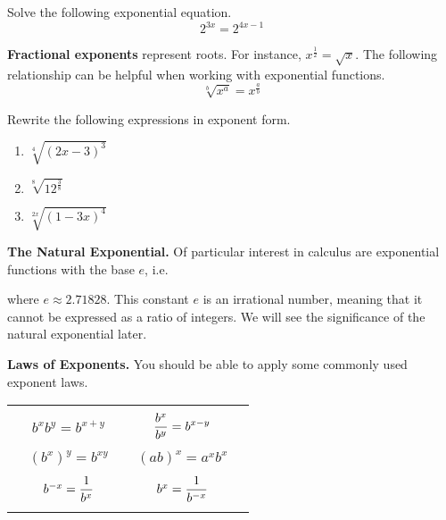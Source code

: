 \documentclass[12pt]{article}
\begin{document}
\vspace{3mm}

\Example Solve the following exponential equation.
$$2^{3x}=2^{4x-1}$$

\newpage

\textbf{Fractional exponents} represent roots. For instance, $x^{\frac{1}{2}}=\sqrt{x}$. The following relationship can be helpful when working with exponential functions.
$$\sqrt[b]{x^a}=x^{\frac{a}{b}}$$

\Example Rewrite the following expressions in exponent form.

\begin{enumerate}
	\item[\tc{1}] $\sqrt[4]{(2x-3)^3}$
	\vspace{2mm}
	\item[\tc{2}] $\sqrt[8]{12^\frac{3}{8}}$
	\vspace{2mm}
	\item[\tc{3}] $\sqrt[2x]{(1-3x)^4}$
	\vspace{2mm}
\end{enumerate}

\vspace{3mm}

\textbf{The Natural Exponential.} Of particular interest in calculus are exponential functions with the base $e$, i.e.

\vspace{15mm}

where $e\approx 2.71828$. This constant $e$ is an irrational number, meaning that it cannot be expressed as a ratio of integers. We will see the significance of the natural exponential later.

\vspace{5mm}

\textbf{Laws of Exponents.} You should be able to apply some commonly used exponent laws.

\begin{center}
\begin{tabular}{|ccccc|}
	\hline
	& & & & \\
	& $b^xb^y = b^{x+y}$ & & $\displaystyle\frac{b^x}{b^y} = b^{x-y}$ & \\
	& $ $ & & $ $ &  \\
	& $(b^x)^y = b^{xy}$ & & $(ab)^x = a^xb^x$ & \\
	& $ $ & & $ $ &  \\
	& $b^{-x} = \displaystyle\frac{1}{b^x}$ & & $b^{x} = \displaystyle\frac{1}{b^{-x}}$ & \\
	& & & & \\
	\hline
\end{tabular}
\end{center}
\end{document}
